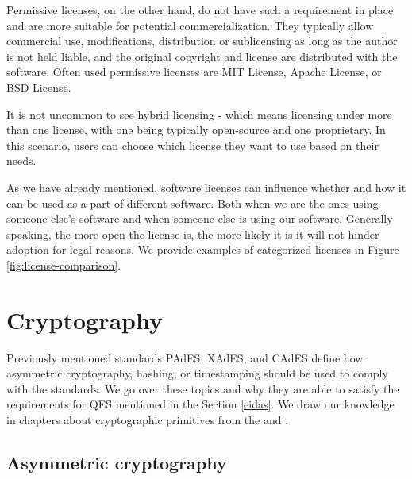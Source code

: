\documentclass[thesismargins, english, thesislinespacing, onelinechapterstyle, upjsfrontpage]{rnthesis}
\begin{document}
Permissive licenses, on the other hand, do not have such a requirement in place and are more suitable for potential commercialization.
They typically allow commercial use, modifications, distribution or sublicensing as long as the author is not held liable, and the original copyright and license are distributed with the software.
Often used permissive licenses are MIT License, Apache License, or BSD License.

It is not uncommon to see hybrid licensing - which means licensing under more than one license, with one being typically open-source and one proprietary.
In this scenario, users can choose which license they want to use based on their needs.


As we have already mentioned, software licenses can influence whether and how it can be used as a part of different software.
Both when we are the ones using someone else's software and when someone else is using our software.
Generally speaking, the more open the license is, the more likely it is it will not hinder adoption for legal reasons.
We provide examples of categorized licenses in Figure \ref{fig:license-comparison}.

\iffalse %
Various possible combinations can be seen in Figure \ref{fig:license-compatibility}, where greyed out options mean such combination is not possible unless a separate licensing agreement is reached with the copyright owner.

\obrazok{./figures/license-compatibility}{Schematic representation of license directionality. \osoba{Morin 2012} \cite{licensing}}{license-compatibility}
\fi

\section{Cryptography} \label{cryptography}

Previously mentioned standards PAdES, XAdES, and CAdES define how asymmetric cryptography, hashing, or timestamping should be used to comply with the standards.
We go over these topics and why they are able to satisfy the requirements for QES mentioned in the Section \ref{eidas}.
We draw our knowledge in chapters about cryptographic primitives from the \cite{cryptotxtbook} and \cite{cryptojoy}.

\subsection{Asymmetric cryptography}
\end{document}

